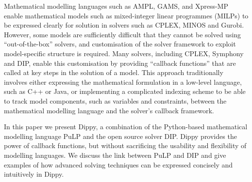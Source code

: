 Mathematical modelling languages such as AMPL, GAMS, and Xpress-MP enable mathematical models such as mixed-integer linear programmes (MILPs) to be expressed clearly for solution in solvers such as CPLEX, MINOS and Gurobi.
However, some models are sufficiently difficult that they cannot be solved using ``out-of-the-box'' solvers, and customisation of the solver framework to exploit model-specific structure is required.
Many solvers, including CPLEX, Symphony and DIP, enable this customisation by providing ``callback functions'' that are called at key steps in the solution of a model.
This approach traditionally involves either expressing the mathematical formulation in a low-level language, such as C++ or Java, or implementing a complicated indexing scheme to be able to track model components, such as variables and constraints, between the mathematical modelling language and the solver's callback framework.

In this paper we present Dippy, a combination of the Python-based mathematical modelling language PuLP and the open source solver DIP. 
Dippy provides the power of callback functions, but without sacrificing the usability and flexibility of modelling languages.
We discuss the link between PuLP and DIP and give examples of how advanced solving techniques can be expressed concisely and intuitively in Dippy.